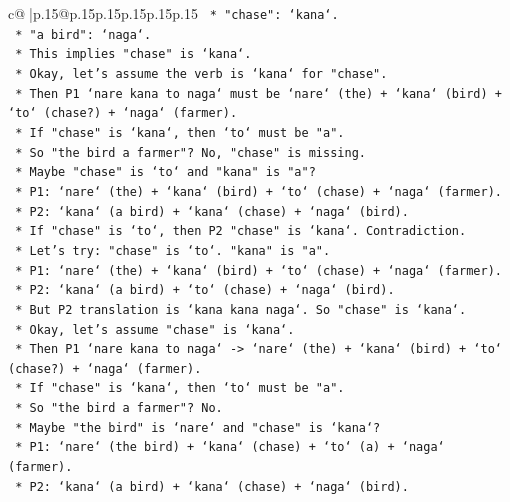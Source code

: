 \documentclass{article}
\begin{document}
{\begin{supertabular}{c@{$\;$}|p{.15\linewidth}@{}p{.15\linewidth}p{.15\linewidth}p{.15\linewidth}p{.15\linewidth}p{.15\linewidth}}
{{{\texttt{                    *   "chase": `kana`.} \\
\texttt{                    *   "a bird": `naga`.} \\
\texttt{                    *   This implies "chase" is `kana`.} \\
\texttt{            *   Okay, let's assume the verb is `kana` for "chase".} \\
\texttt{            *   Then P1 `nare kana to naga` must be `nare` (the) + `kana` (bird) + `to` (chase?) + `naga` (farmer).} \\
\texttt{            *   If "chase" is `kana`, then `to` must be "a".} \\
\texttt{            *   So "the bird a farmer"? No, "chase" is missing.} \\
\texttt{            *   Maybe "chase" is `to` and "kana" is "a"?} \\
\texttt{            *   P1: `nare` (the) + `kana` (bird) + `to` (chase) + `naga` (farmer).} \\
\texttt{            *   P2: `kana` (a bird) + `kana` (chase) + `naga` (bird).} \\
\texttt{            *   If "chase" is `to`, then P2 "chase" is `kana`. Contradiction.} \\
\texttt{            *   Let's try: "chase" is `to`. "kana" is "a".} \\
\texttt{            *   P1: `nare` (the) + `kana` (bird) + `to` (chase) + `naga` (farmer).} \\
\texttt{            *   P2: `kana` (a bird) + `to` (chase) + `naga` (bird).} \\
\texttt{            *   But P2 translation is `kana kana naga`. So "chase" is `kana`.} \\
\texttt{            *   Okay, let's assume "chase" is `kana`.} \\
\texttt{            *   Then P1 `nare kana to naga` {-}> `nare` (the) + `kana` (bird) + `to` (chase?) + `naga` (farmer).} \\
\texttt{            *   If "chase" is `kana`, then `to` must be "a".} \\
\texttt{            *   So "the bird a farmer"? No.} \\
\texttt{            *   Maybe "the bird" is `nare` and "chase" is `kana`?} \\
\texttt{            *   P1: `nare` (the bird) + `kana` (chase) + `to` (a) + `naga` (farmer).} \\
\texttt{            *   P2: `kana` (a bird) + `kana` (chase) + `naga` (bird).} \\
}}}
\end{supertabular}}
\end{document}
